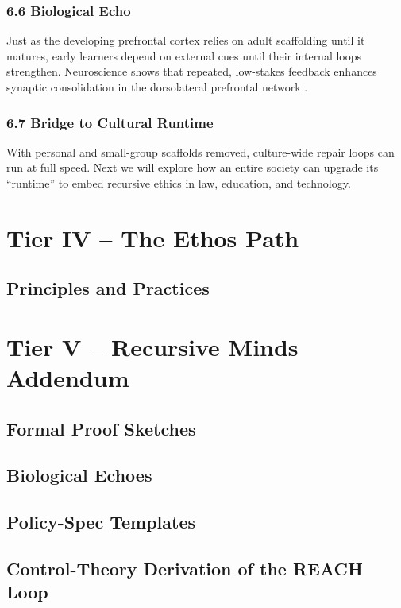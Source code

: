 \documentclass{book}       %
\begin{document}
\section*{6.6  Biological Echo}
Just as the developing prefrontal cortex relies on adult scaffolding until it matures,  
early learners depend on external cues until their internal loops strengthen.  
Neuroscience shows that repeated, low-stakes feedback enhances synaptic consolidation in the dorsolateral prefrontal network \cite{BenYakov2015_SynapticScaffold}.  

\section*{6.7  Bridge to Cultural Runtime}
With personal and small-group scaffolds removed, culture-wide repair loops can run at full speed.  
Next we will explore how an entire society can upgrade its “runtime” to embed recursive ethics in law, education, and technology.




\part{Tier IV – The Ethos Path}
\chapter{Principles and Practices}

\part{Tier V – Recursive Minds Addendum}
\chapter{Formal Proof Sketches}
\chapter{Biological Echoes}
\chapter{Policy-Spec Templates}



\appendix
\renewcommand{\thesection}{\Alph{section}} %

\chapter{Control-Theory Derivation of the REACH Loop}
\end{document}
